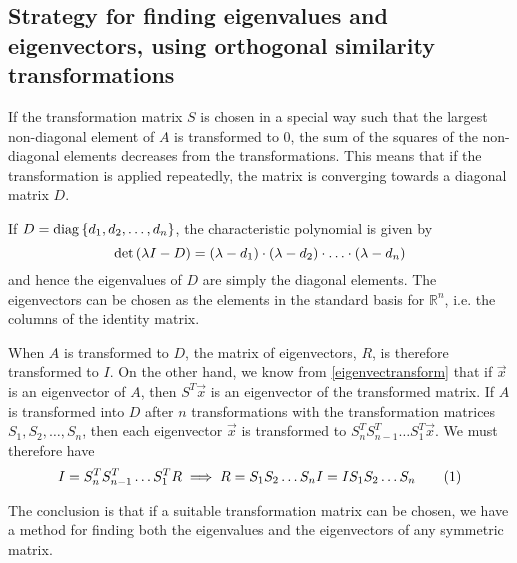 \documentclass[12pt,english,a4paper]{report}
\newcommand{\R}{\mathbb{R}}
\newcommand{\eqtag}[1]{\refstepcounter{equation}\tag{\theequation}\label{#1}}
\begin{document}
\subsection{Strategy for finding eigenvalues and eigenvectors, using orthogonal similarity transformations}
If the transformation matrix \(S\) is chosen in a special way such that the largest non-diagonal element of \(A\) is transformed to \(0\), the sum of the squares of the non-diagonal elements decreases from the transformations. This means that if the transformation is applied repeatedly, the matrix is converging towards a diagonal matrix \(D\).

If \(D=\operatorname{diag}\qty{d_1,d_2,\dots,d_n}\), the characteristic polynomial is given by
\[
\operatorname{det}\qty(\lambda I - D) = \qty(\lambda-d_1)\cdot\qty(\lambda-d_2)\cdot\ldots\cdot\qty(\lambda-d_n)
\]
and hence the eigenvalues of \(D\) are simply the diagonal elements. The eigenvectors can be chosen as the elements in the standard basis for \(\R^n\), i.e. the columns of the identity matrix.

When \(A\) is transformed to \(D\), the matrix of eigenvectors, \(R\), is therefore transformed to \(I\). On the other hand, we know from \vref{eigenvectransform} that if \(\vec{x}\) is an eigenvector of \(A\), then \(S^T\vec{x}\) is an eigenvector of the transformed matrix. If \(A\) is transformed into \(D\) after \(n\) transformations with the transformation matrices \(S_1,S_2,\dots,S_n\), then each eigenvector \(\vec{x}\) is transformed to \(S_n^TS_{n-1}^T\dots S_1^T\vec{x}\). We must therefore have
\[
I = S_n^TS_{n-1}^T\dots S_1^TR \implies R = S_1S_2\dots S_nI = IS_1S_2\dots S_n \eqtag{findR}
\]

The conclusion is that if a suitable transformation matrix can be chosen, we have a method for finding both the eigenvalues and the eigenvectors of any symmetric matrix.

\end{document}

